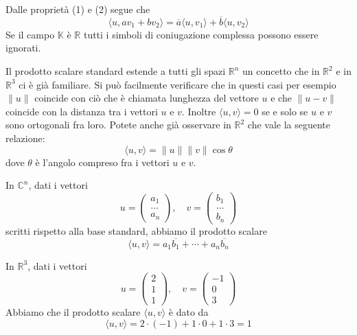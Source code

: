 \begin{observation}
	Dalle propriet\`a (1) e (2) segue che
	\begin{equation*}
		\langle u, av_1 + bv_2 \rangle =
		\overline{a} \langle u, v_1 \rangle + \overline{b} \langle u, v_2 \rangle
	\end{equation*}
	Se il campo $\mathbb{K}$ \`e $\mathbb{R}$ tutti i simboli di coniugazione
	complessa possono essere ignorati.
\end{observation}

\begin{observation}
	Il prodotto scalare standard estende a tutti gli spazi $\mathbb{R}^n$ un concetto
	che in $\mathbb{R}^2$ e in $\mathbb{R}^3$ ci \`e gi\`a familiare. Si pu\`o
	facilmente verificare che in questi casi per esempio $\| u \|$ coincide con
	ci\`o che \`e chiamata lunghezza del vettore $u$ e che $\| u - v \|$ coincide
	con la distanza tra i vettori $u$ e $v$. Inoltre $\langle u, v \rangle = 0$ se
	e solo se $u$ e $v$ sono ortogonali fra loro. Potete anche gi\`a osservare in
	$\mathbb{R}^2$ che vale la seguente relazione:
	\begin{equation*}
		\langle u, v \rangle = \| u \| \| v \| \cos \theta
	\end{equation*}
	dove $\theta$ \`e l'angolo compreso fra i vettori $u$ e $v$.
\end{observation}

\begin{example}
	In $\mathbb{C}^n$, dati i vettori
	\begin{equation*}
		u = \begin{pmatrix}
			a_1 \\ \dots \\ a_n
		\end{pmatrix}, \quad
		v = \begin{pmatrix}
			b_1 \\ \dots \\ b_n
		\end{pmatrix}
	\end{equation*}
	scritti rispetto alla base standard, abbiamo il prodotto scalare
	\begin{equation*}
		\langle u, v \rangle = a_1 \overline{b_1} + \cdots + a_n \overline{b_n}
	\end{equation*}
\end{example}

\begin{example}
	In $\mathbb{R}^3$, dati i vettori 
	\[
		u = \begin{pmatrix}
			2 \\ 1 \\ 1
		\end{pmatrix}, \quad
		v = \begin{pmatrix}
			-1 \\ 0 \\ 3
		\end{pmatrix}
	\]
	Abbiamo che il prodotto scalare $\langle u, v \rangle$ \`e dato da 
	\[
		\langle u, v \rangle = 2 \cdot (-1) + 1 \cdot 0 + 1 \cdot 3 = 1
	\]
\end{example}